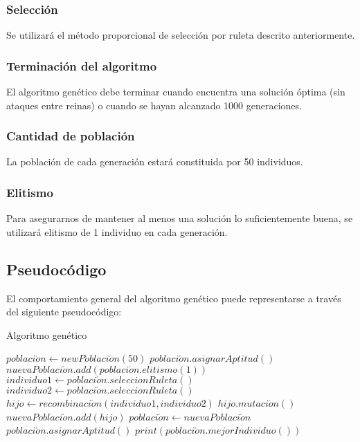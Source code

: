 \subsubsection{Selecci\'on}

Se utilizará el método proporcional de selección por ruleta descrito anteriormente.

\subsubsection{Terminaci\'on del algoritmo}

El algoritmo genético debe terminar cuando encuentra una solución óptima (sin ataques entre reinas) o cuando se hayan alcanzado 1000 generaciones.

\subsubsection{Cantidad de poblaci\'on}

La población de cada generación estará constituida por 50 individuos.

\subsubsection{Elitismo}

Para asegurarnos de mantener al menos una solución lo suficientemente buena, se utilizará elitismo de 1 individuo en cada generación.

\subsection{Pseudoc\'odigo}

El comportamiento general del algoritmo genético puede representarse a través del siguiente pseudocódigo:\medskip

\begin{algorithm}
\caption{Algoritmo genético}
\begin{algorithmic}
  \State $poblaci\acute{o}n\gets new Poblaci\acute{o}n(50)$
  \State $poblaci\acute{o}n.asignarAptitud()$
    \State $nuevaPoblaci\acute{o}n.add(poblaci\acute{o}n.elitismo(1))$
      \State $individuo1\gets poblaci\acute{o}n.seleccionRuleta()$
      \State $individuo2\gets poblaci\acute{o}n.seleccionRuleta()$
      \State $hijo\gets recombinaci\acute{o}n(individuo1, individuo2)$
      \State $hijo.mutaci\acute{o}n()$
      \State $nuevaPoblaci\acute{o}n.add(hijo)$
    \EndWhile
    \State $poblaci\acute{o}n\gets nuevaPoblaci\acute{o}n$
    \State $poblaci\acute{o}n.asignarAptitud()$
  \EndWhile
  \State $print(poblaci\acute{o}n.mejorIndividuo())$
\end{algorithmic}
\end{algorithm}

